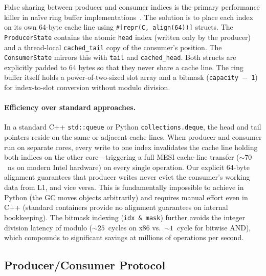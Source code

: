 \documentclass[11pt,letterpaper]{article}
\begin{document}
False sharing between producer and consumer indices is the primary performance killer in na\"ive ring buffer implementations~\cite{drepper2007memory}. The solution is to place each index on its own 64-byte cache line using \texttt{\#[repr(C, align(64))]} structs. The \texttt{ProducerState} contains the atomic \texttt{head} index (written only by the producer) and a thread-local \texttt{cached\_tail} copy of the consumer's position. The \texttt{ConsumerState} mirrors this with \texttt{tail} and \texttt{cached\_head}. Both structs are explicitly padded to 64 bytes so that they never share a cache line. The ring buffer itself holds a power-of-two-sized slot array and a bitmask (\texttt{capacity $-$ 1}) for index-to-slot conversion without modulo division.

\paragraph{Efficiency over standard approaches.}
In a standard C++ \texttt{std::queue} or Python \texttt{collections.deque}, the head and tail pointers reside on the same or adjacent cache lines. When producer and consumer run on separate cores, every write to one index invalidates the cache line holding both indices on the other core---triggering a full MESI cache-line transfer (${\sim}70$~ns on modern Intel hardware) on every single operation. Our explicit 64-byte alignment guarantees that producer writes never evict the consumer's working data from L1, and vice versa. This is fundamentally impossible to achieve in Python (the GC moves objects arbitrarily) and requires manual effort even in C++ (standard containers provide no alignment guarantees on internal bookkeeping). The bitmask indexing (\texttt{idx \& mask}) further avoids the integer division latency of modulo (${\sim}25$~cycles on x86 vs.\ ${\sim}1$~cycle for bitwise AND), which compounds to significant savings at millions of operations per second.

\subsection{Producer/Consumer Protocol}
\end{document}
